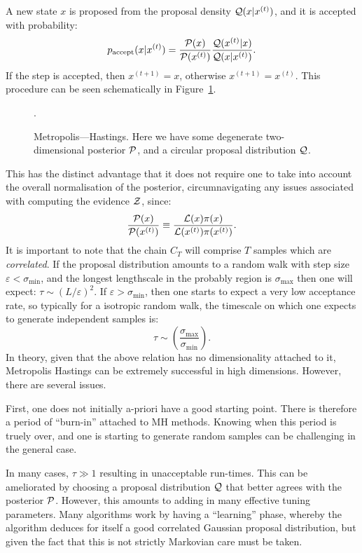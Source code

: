 A new state $x$ is proposed from the proposal density $\mathcal{Q}(x|x^{(t)})$, and it is accepted with probability:
\begin{equation}
  p_\mathrm{accept}(x|x^{(t)}) = \frac{\mathcal{P}(x)}{\mathcal{P}(x^{(t)})}\frac{\mathcal{Q}(x^{(t)}|x)}{\mathcal{Q}(x|x^{(t)})}.
\end{equation}
If the step is accepted, then $x^{(t+1)}=x$, otherwise $x^{(t+1)} = x^{(t)}$. This procedure can be seen schematically in Figure~\ref{fig:sm:MH}.
\begin{figure}
  \centering
  
  \caption{Metropolis---Hastings. Here we have some degenerate two-dimensional posterior $\mathcal{P}$, and a circular proposal distribution $\mathcal{Q}$.\label{fig:sm:MH}}.
\end{figure}


This has the distinct advantage that it does not require one to take into account the overall normalisation of the posterior, circumnavigating any issues associated with computing the evidence $\mathcal{Z}$, since:
\begin{equation}
  \frac{\mathcal{P}(x)}{\mathcal{P}(x^{(t)})} \equiv
  \frac{\mathcal{L}(x)\pi(x)}{\mathcal{L}(x^{(t)})\pi(x^{(t)})}.
\end{equation}
It is important to note that the chain $C_T$ will comprise $T$ samples which are {\em correlated}. If the proposal distribution amounts to a random walk with step size $\varepsilon<\sigma_{\min{}}$, and the longest lengthscale in the probably region is $\sigma_{\max{}}$  then one will expect: $\tau \sim {(L/\varepsilon)}^2$. If $\varepsilon>\sigma_{\min{}}$, then one starts to expect a very low acceptance rate, so typically for a isotropic random walk, the timescale on which one expects to generate independent samples is:
\begin{equation}
  \tau \sim \left( \frac{\sigma_{\max{}}}{\sigma_{\min{}}} \right).
\end{equation}
In theory, given that the above relation has no dimensionality attached to it, Metropolis Hastings can be extremely successful in high dimensions. However, there are several issues.

First, one does not initially a-priori have a good starting point. There is therefore a period of ``burn-in'' attached to MH methods. Knowing when this period is truely over, and one is starting to generate random samples can be challenging in the general case.

In many cases, $\tau\gg1$ resulting in unacceptable run-times. This can be ameliorated by choosing a proposal distribution $\mathcal{Q}$ that better agrees with the posterior $\mathcal{P}$. However, this amounts to adding in many effective tuning parameters. Many algorithms work by having a ``learning'' phase, whereby the algorithm deduces for itself a good correlated Gaussian proposal distribution, but given the fact that this is not strictly Markovian care must be taken.



